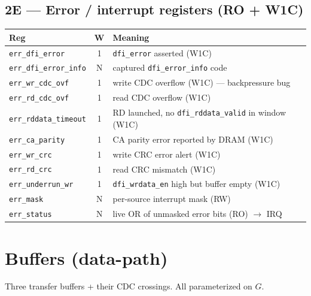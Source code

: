 \documentclass[11pt]{article}
\newcommand{\sig}[1]{\texttt{#1}}
\newcommand{\reg}[1]{\texttt{#1}}
\begin{document}
\subsection{2E --- Error / interrupt registers (RO + W1C)}
\begin{center}\begin{tabular}{@{}lcL{8.2cm}@{}}\toprule
Reg & W & Meaning \\ \midrule
\reg{err\_dfi\_error} & 1 & \sig{dfi\_error} asserted (W1C) \\
\reg{err\_dfi\_error\_info} & N & captured \sig{dfi\_error\_info} code \\
\reg{err\_wr\_cdc\_ovf} & 1 & write CDC overflow (W1C) --- backpressure bug \\
\reg{err\_rd\_cdc\_ovf} & 1 & read CDC overflow (W1C) \\
\reg{err\_rddata\_timeout} & 1 & RD launched, no \sig{dfi\_rddata\_valid} in window (W1C) \\
\reg{err\_ca\_parity} & 1 & CA parity error reported by DRAM (W1C) \\
\reg{err\_wr\_crc} & 1 & write CRC error alert (W1C) \\
\reg{err\_rd\_crc} & 1 & read CRC mismatch (W1C) \\
\reg{err\_underrun\_wr} & 1 & \sig{dfi\_wrdata\_en} high but buffer empty (W1C) \\
\reg{err\_mask} & N & per-source interrupt mask (RW) \\
\reg{err\_status} & N & live OR of unmasked error bits (RO) $\to$ IRQ \\ \bottomrule
\end{tabular}\end{center}

\section{Buffers (data-path)}

Three transfer buffers + their CDC crossings. All parameterized on $G$.
\end{document}
